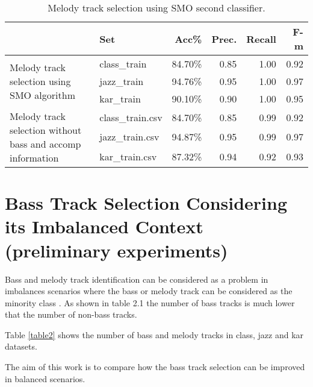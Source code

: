 \documentclass{article}
\begin{document}
\begin{table}
\small
\begin{center}
\begin{tabular}{  l | l | r | r | r | r }
\hline
 & Set & Acc\% & Prec. & Recall & F-m \\
\hline
\hline
\multirow{3}{3cm}{Melody track selection using SMO algorithm} & class\_train & 84.70\% & 0.85 & 1.00 & 0.92 \\
 & jazz\_train & 94.76\% & 0.95 & 1.00 & 0.97 \\
 & kar\_train & 90.10\% & 0.90 & 1.00 & 0.95 \\
\hline
\multirow{3}{3cm}{Melody track selection without bass and accomp information} & class\_train.csv & 84.70\% & 0.85 & 0.99 & 0.92 \\
 & jazz\_train.csv & 94.87\% & 0.95 & 0.99 & 0.97 \\
 & kar\_train.csv & 87.32\% & 0.94 & 0.92 & 0.93 \\
\hline
\end{tabular}
\caption{Melody track selection using SMO second classifier.}
\label{table25}
\end{center}
\end{table}
















\section{Bass Track Selection Considering its Imbalanced Context (preliminary experiments)}

Bass and melody track identification can be considered as a problem in imbalances scenarios where the bass or melody track can be considered as the minority class \cite{martin2009melodic}. As shown in table 2.1 the number of bass tracks is much lower that the number of non-bass tracks.

Table \ref{table2} shows the number of bass and melody tracks in class, jazz and kar datasets. 

The aim of this work is to compare how the bass track selection can be improved in balanced scenarios.
\end{document}
